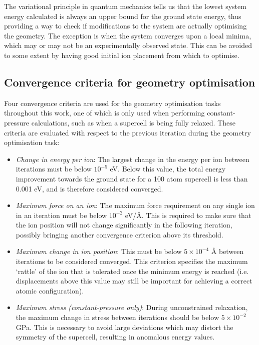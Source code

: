 The variational principle in quantum mechanics tells us that the lowest system energy calculated is always an upper bound for the ground state energy, thus providing a way to check if modifications to the system are actually optimising the geometry. The exception is when the system converges upon a local minima, which may or may not be an experimentally observed state. This can be avoided to some extent by having good initial ion placement from which to optimise.

\subsection{Convergence criteria for geometry optimisation} \label{convergence_criteria}

Four convergence criteria are used for the geometry optimisation tasks throughout this work, one of which is only used when performing constant-pressure calculations, such as when a supercell is being fully relaxed. These criteria are evaluated with respect to the previous iteration during the geometry optimisation task:

\begin{itemize}
\item \emph{Change in energy per ion}: The largest change in the energy per ion between iterations must be below $10^{-5}$ eV. Below this value, the total energy improvement towards the ground state for a 100 atom supercell is less than 0.001 eV, and is therefore considered converged.
\item \emph{Maximum force on an ion}: The maximum force requirement on any single ion in an iteration must be below $10^{-2}$ eV/\r{A}. This is required to make sure that the ion position will not change significantly in the following iteration, possibly bringing another convergence criterion above its threshold.
\item \emph{Maximum change in ion position}: This must be below $5 \times 10^{-4}$ \r{A} between iterations to be considered converged. This criterion specifies the maximum `rattle' of the ion that is tolerated once the minimum energy is reached (i.e. displacements above this value may still be important for achieving a correct atomic configuration). 
\item \emph{Maximum stress (constant-pressure only)}: During unconstrained relaxation, the maximum change in stress between iterations should be below $5 \times 10^{-2}$ GPa. This is necessary to avoid large deviations which may distort the symmetry of the supercell, resulting in anomalous energy values.
\end{itemize}

